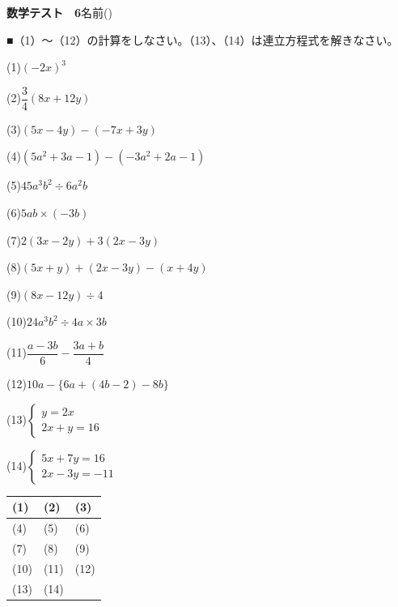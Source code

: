 \documentclass[a4paper,11pt]{ltjsarticle}
\newlength{\qcol}\setlength{\qcol}{0.47\textwidth}
\newlength{\qgap}
\newlength{\anscolw}\setlength{\anscolw}{0.30\textwidth}
\newlength{\ansh}
\newcommand{\Q}[2]{\parbox[t]{\qcol}{\raggedright (#1)\hspace{0.6em}$\displaystyle #2$}}
\newcommand{\QR}[4]{\Q{#1}{#2}\hfill\Q{#3}{#4}\par\vspace{\qgap}}
\newcommand{\anscell}[1]{\rule[-\ansdrop]{0pt}{\ansh}(#1)}
\newlength{\ansdrop}
\begin{document}
{\large\bfseries 数学テスト　6}\hfill 名前(\underline{\hspace{32mm}})\par\vspace{3mm}
■（1）〜（12）の計算をしなさい。（13）、（14）は連立方程式を解きなさい。\par\vspace{3mm}
\setlength{\qgap}{11mm}
\QR{1}{(-2x)^3}{2}{\dfrac{3}{4}(8x+12y)}
\QR{3}{(5x-4y)-(-7x+3y)}{4}{(5a^2+3a-1)-(-3a^2+2a-1)}
\QR{5}{45a^3b^2\div6a^2b}{6}{5ab\times(-3b)}
\QR{7}{2(3x-2y)+3(2x-3y)}{8}{(5x+y)+(2x-3y)-(x+4y)}
\QR{9}{(8x-12y)\div4}{10}{24a^3b^2\div4a\times3b}
\QR{11}{\dfrac{a-3b}{6}-\dfrac{3a+b}{4}}{12}{10a-\{6a+(4b-2)-8b\}}
\QR{13}{\left\{\begin{array}{l} y=2x \\ 2x+y=16 \end{array}\right.}{14}{\left\{\begin{array}{l} 5x+7y=16 \\ 2x-3y=-11 \end{array}\right.}
\vfill
\setlength{\ansh}{12mm}\setlength{\ansdrop}{8mm}%
\begin{center}\begin{tabular}{|p{\anscolw}|p{\anscolw}|p{\anscolw}|}\hline
\anscell{1} & \anscell{2} & \anscell{3} \\\hline
\anscell{4} & \anscell{5} & \anscell{6} \\\hline
\anscell{7} & \anscell{8} & \anscell{9} \\\hline
\anscell{10} & \anscell{11} & \anscell{12} \\\hline
\anscell{13} & \anscell{14} &  \\\hline
\end{tabular}\end{center}
\end{document}
